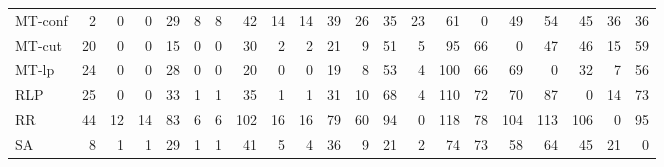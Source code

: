\begin{table}[htbp]
\begin{tabular}{lrrrrrrrrrrrrrrrrrrrr}
MT-conf & 2 & 0 & 0 & 29 & 8 & 8 & 42 & 14 & 14 & 39 & 26 & 35 & 23 & 61 & 0 & 49 & 54 & 45 & 36 & 36 \\
MT-cut & 20 & 0 & 0 & 15 & 0 & 0 & 30 & 2 & 2 & 21 & 9 & 51 & 5 & 95 & 66 & 0 & 47 & 46 & 15 & 59 \\
MT-lp & 24 & 0 & 0 & 28 & 0 & 0 & 20 & 0 & 0 & 19 & 8 & 53 & 4 & 100 & 66 & 69 & 0 & 32 & 7 & 56 \\
RLP & 25 & 0 & 0 & 33 & 1 & 1 & 35 & 1 & 1 & 31 & 10 & 68 & 4 & 110 & 72 & 70 & 87 & 0 & 14 & 73 \\
RR & 44 & 12 & 14 & 83 & 6 & 6 & 102 & 16 & 16 & 79 & 60 & 94 & 0 & 118 & 78 & 104 & 113 & 106 & 0 & 95 \\
SA & 8 & 1 & 1 & 29 & 1 & 1 & 41 & 5 & 4 & 36 & 9 & 21 & 2 & 74 & 73 & 58 & 64 & 45 & 21 & 0 \\
\bottomrule
\end{tabular}
\end{table}
